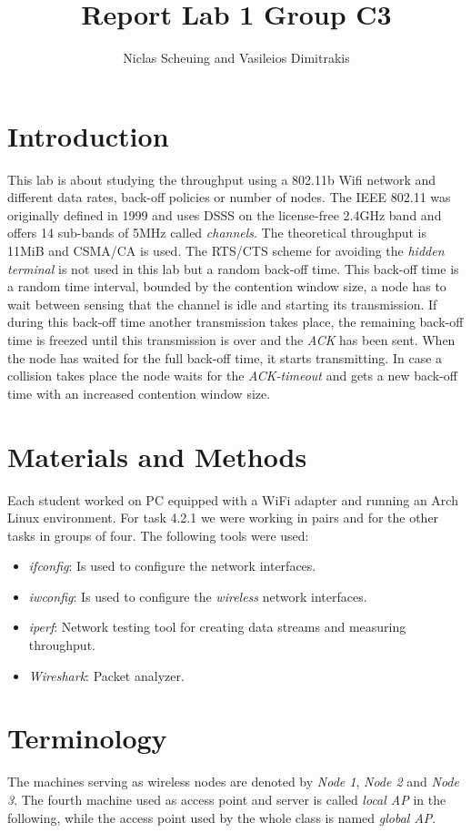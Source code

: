 \documentclass[12pt,a4paper]{article}
\title{Report Lab 1 Group C3}
\author{Niclas Scheuing and Vasileios Dimitrakis}
\begin{document}
\maketitle
\section{Introduction}
This lab is about studying the throughput using a 802.11b Wifi network and different data rates, back-off policies or number of nodes.
The IEEE 802.11\cite{802b:wiki} was originally defined in 1999 and uses DSSS on the license-free 2.4GHz band and offers 14 sub-bands of 5MHz called \emph{channels}. The theoretical throughput is 11MiB and CSMA/CA is used. The RTS/CTS scheme for avoiding the \emph{hidden terminal} is not used in this lab but a random back-off time.
This back-off time is a random time interval, bounded by the contention window size, a node has to wait between sensing that the channel is idle and starting its transmission. If during this back-off time another transmission takes place, the remaining back-off time is freezed until this transmission is over and the \emph{ACK} has been sent. When the node has waited for the full back-off time, it starts transmitting. In case a collision takes place the node waits for the \emph{ACK-timeout} and gets a new back-off time with an increased contention window size.

\section{Materials and Methods}
Each student worked on PC equipped with a WiFi adapter and running an Arch Linux environment.
For task 4.2.1 we were working in pairs and for the other tasks in groups of four.
The following tools were used:
\begin{itemize}

\item \emph{ifconfig}: Is used to configure the network interfaces.
\item \emph{iwconfig}: Is used to configure the \emph{wireless} network interfaces.
\item \emph{iperf}: Network testing tool for creating data streams and measuring throughput.
\item \emph{Wireshark}: Packet analyzer.
\end{itemize}

\section{Terminology}
The machines serving as wireless nodes are denoted by \emph{Node 1}, \emph{Node 2} and \emph{Node 3}.
The fourth machine used as access point and server is called \emph{local AP} in the following, while the access point used by the whole class is named \emph{global AP}.
\end{document}
